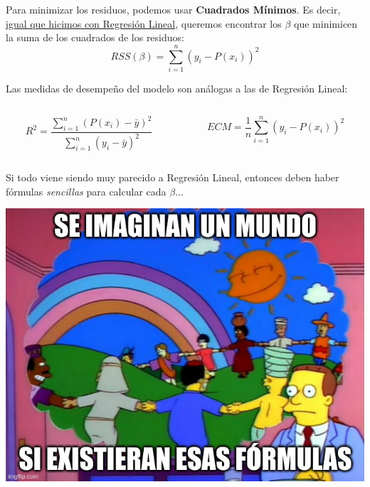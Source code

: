 \documentclass[aspectratio=169, usenames,dvipsnames]{beamer}
\begin{document}
\begin{frame}
    Para minimizar los residuos, podemos usar \textbf{Cuadrados Mínimos}. Es decir, \underline{igual que hicimos con Regresión Lineal}, queremos encontrar los $\beta$ que minimicen la suma de los cuadrados de los residuos:
    \[RSS(\beta) = \displaystyle\sum_{i=1}^n (y_i - P(x_i))^2\]

    \pause
    \vspace{1em}
    Las medidas de desempeño del modelo son análogas a las de Regresión Lineal:
    \vspace{0.5em}
    \begin{columns}
        \begin{column}{0.5\textwidth}
            \[R^2 = \dfrac{\sum_{i=1}^n (P(x_i) - \bar{y})^2}{\sum_{i=1}^n (y_i - \bar{y})^2}\]
        \end{column}
        \begin{column}{0.5\textwidth}
            \[ECM = \dfrac{1}{n}\sum_{i=1}^n (y_i - P(x_i))^2\]
        \end{column}

    \end{columns}
\end{frame}

\begin{frame}
    Si todo viene siendo muy parecido a Regresión Lineal, entonces deben haber fórmulas \textit{sencillas} para calcular cada $\beta$...

    \pause
    \centering
    \includegraphics[scale=0.4]{img/meme_03.jpg}
\end{frame}
\end{document}
